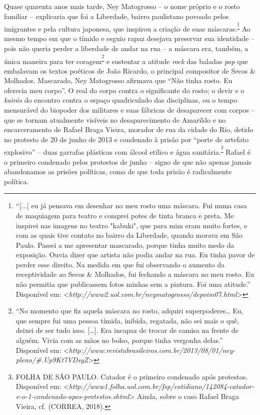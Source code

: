 Quase quarenta anos mais tarde, Ney Matogrosso -- o nome próprio e o
rosto familiar -- explicaria que foi a Liberdade, bairro paulistano
povoado pelos imigrantes e pela cultura japonesa, que inspirou a criação
de suas máscaras.\textsuperscript{\footnote{``{[}...{]} eu já pensava em
  desenhar no meu rosto uma máscara. Fui numa casa de maquiagem para
  teatro e comprei potes de tinta branca e preta. Me inspirei nas
  imagens no teatro "kabuki", que para mim eram muito fortes, e com as
  quais tive contato no bairro da Liberdade, quando morava em São Paulo.
  Passei a me apresentar mascarado, porque tinha muito medo da
  exposição. Ouvia dizer que artista não podia andar na rua. Eu tinha
  pavor de perder esse direito. Na medida em que fui observando o
  aumento da receptividade ao Secos \& Molhados, fui fechando a máscara
  no meu rosto. Eu não permitia que publicassem fotos minhas sem a
  pintura. Foi uma atitude.'' Disponível em:
  \textless{}{\emph{http://www2.uol.com.br/neymatogrosso/depoim07.html}}\textgreater{}}}
Ao mesmo tempo em que o tímido e esguio rapaz desejava preservar sua
identidade -- pois não queria perder a liberdade de andar na rua -- a
máscara era, também, a única maneira para ter
coragem\textsuperscript{\footnote{``No momento que fiz aquela máscara no
  rosto, adquiri superpoderes\ldots{} Eu, que sempre fui uma pessoa
  tímida, inibida, regatada, não sei mais o quê, deixei de ser tudo
  isso. {[}\ldots{}{]}. Era incapaz de trocar de camisa na frente de
  alguém. Vivia com as mãos no bolso, porque tinha vergonha delas.''
  Disponível em:
  \textless{}{\emph{\emph{http://www.revistabrasileiros.com.br/2013/08/01/ney-pleno/\#.Up9Kt7VDsyZ}}}\textgreater{}}}
e sustentar a atitude \emph{rock} das baladas \emph{pop }que embalavam
os textos poéticos de João Ricardo, o principal compositor de Secos \&
Molhados. Mascarado, Ney Matogrosso afirmava que ``Não tinha rosto. Eu
oferecia meu corpo''. O real do corpo contra o significante do rosto; o
devir e o \emph{kairós} do encontro contra o espaço quadriculado das
disciplinas, ou o tempo mensurável do biopoder dos militares e suas
fábricas de desaparecer com corpos -- que se tornam atualmente visíveis
no desaparecimento de Amarildo e no encarceramento de Rafael Braga
Vieira, morador de rua da cidade do Rio, detido no protesto de 20 de
junho de 2013 e condenado à prisão por ``porte de artefato explosivo''
-- duas garrafas plásticas com álcool etílico e água
sanitária.\textsuperscript{\footnote{FOLHA DE SÃO PAULO. Catador é o
  primeiro condenado após protestos. Disponível em:
  \textless{}{\emph{http://www1.folha.uol.com.br/fsp/cotidiano/142084-catador-e-o-1-condenado-apos-protestos.shtml}}\textgreater{}
  Ainda, sobre o caso Rafael Braga Vieira, cf. (CORREA, 2018).}} Rafael
é o primeiro condenado pelos protestos de junho -- signo de que não
apenas jamais abandonamos as prisões políticas, como de que toda prisão
é radicalmente política.


